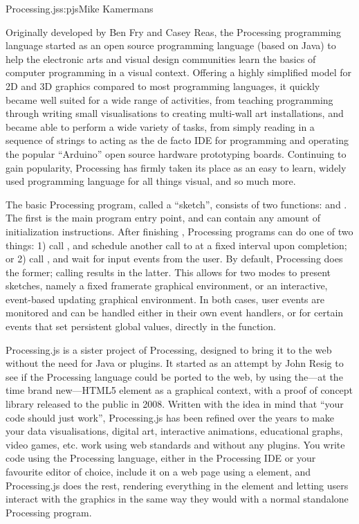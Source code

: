 \begin{aosachapter}{Processing.js}{s:pjs}{Mike Kamermans}


Originally developed by Ben Fry and Casey Reas, the Processing
programming language started as an open source programming language
(based on Java) to help the electronic arts and visual design
communities learn the basics of computer programming in a visual
context. Offering a highly simplified model for 2D and 3D graphics
compared to most programming languages, it quickly became well suited
for a wide range of activities, from teaching programming through
writing small visualisations to creating multi-wall art installations,
and became able to perform a wide variety of tasks, from simply reading in a
sequence of strings to acting as the de facto IDE for programming and
operating the popular ``Arduino'' open source hardware prototyping
boards. Continuing to gain popularity, Processing has firmly taken
its place as an easy to learn, widely used programming language for
all things visual, and so much more.

The basic Processing program, called a ``sketch'', consists of two
functions:  and . The first is the main program
entry point, and can contain any amount of initialization
instructions. After finishing , Processing programs can do
one of two things: 1) call , and
schedule another call to  at a fixed
interval upon completion; or 2) call , and
wait for input events from the user. By default, Processing does the
former; calling  results in the latter. This allows for two modes to
present sketches, namely a fixed framerate graphical environment, or
an interactive, event-based updating graphical environment. In both
cases, user events are monitored and can be handled either in their
own event handlers, or for certain events that set persistent global
values, directly in the  function.

Processing.js is a sister project of Processing, designed to bring
it to the web without the need for Java or plugins. It started as an
attempt by John Resig to see if the Processing language could be
ported to the web, by using the---at the time brand new---HTML5
 element as a graphical context,
with a proof of concept library released to the public in
2008. Written with the idea in mind that ``your code should just
work'', Processing.js has been refined over the years to make your
data visualisations, digital art, interactive animations, educational
graphs, video games, etc. work using web standards and without any
plugins. You write code using the Processing language, either in the
Processing IDE or your favourite editor of choice, include it on a web
page using a  element, and
Processing.js does the rest, rendering everything in the
 element and letting users
interact with the graphics in the same way they would with a normal
standalone Processing program.


\end{aosachapter}
